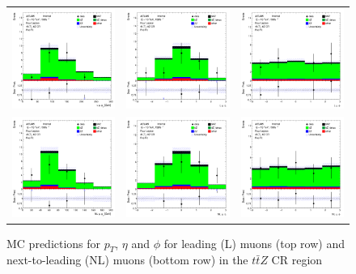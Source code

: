 \begin{figure}[htbp]
    \centering
  \begin{tabular}{ccc}


    \includegraphics[width=.2\textwidth]{figures/PreFitPlots/lep4_ttZ_4T_L_mu_pt} &
    \includegraphics[width=.2\textwidth]{figures/PreFitPlots/lep4_ttZ_4T_L_mu_eta} &
    \includegraphics[width=.2\textwidth]{figures/PreFitPlots/lep4_ttZ_4T_L_mu_phi} \\
    \includegraphics[width=.2\textwidth]{figures/PreFitPlots/lep4_ttZ_4T_NL_mu_pt} &
    \includegraphics[width=.2\textwidth]{figures/PreFitPlots/lep4_ttZ_4T_NL_mu_eta} &
    \includegraphics[width=.2\textwidth]{figures/PreFitPlots/lep4_ttZ_4T_NL_mu_phi} \\

  \end{tabular}
    \caption{MC predictions for $p_{T}$, $\eta$ and $\phi$ for leading (L) muons (top row) and next-to-leading (NL) muons (bottom row) in the $t\bar{t}Z$ CR region }
\end{figure}


